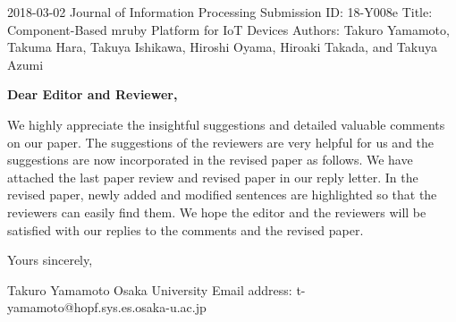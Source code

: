 \documentclass{article}
\begin{document}
\begin{flushleft}
  2018-03-02\newline 
  Journal of Information Processing\newline
  Submission ID: 18-Y008e\newline
  Title: Component-Based mruby Platform for IoT Devices\newline
  Authors: Takuro Yamamoto, Takuma Hara, Takuya Ishikawa, Hiroshi Oyama, Hiroaki Takada, and Takuya Azumi\newline
\end{flushleft}

\textbf{Dear Editor and Reviewer,}\newline

We highly appreciate the insightful suggestions and detailed valuable comments on our paper.
The suggestions of the reviewers are very helpful for us and the suggestions are now incorporated in the revised paper as follows.
We have attached the last paper review and revised paper in our reply letter.
In the revised paper, newly added and modified sentences are highlighted so that the reviewers can easily find them.
We hope the editor and the reviewers will be satisfied with our replies to the comments and the revised paper.
\newline\newline

\begin{flushleft}
  Yours sincerely,\newline

  Takuro Yamamoto\newline
  Osaka University\newline
  Email address: t-yamamoto@hopf.sys.es.osaka-u.ac.jp\newline
\end{flushleft}

\clearpage
\end{document}
